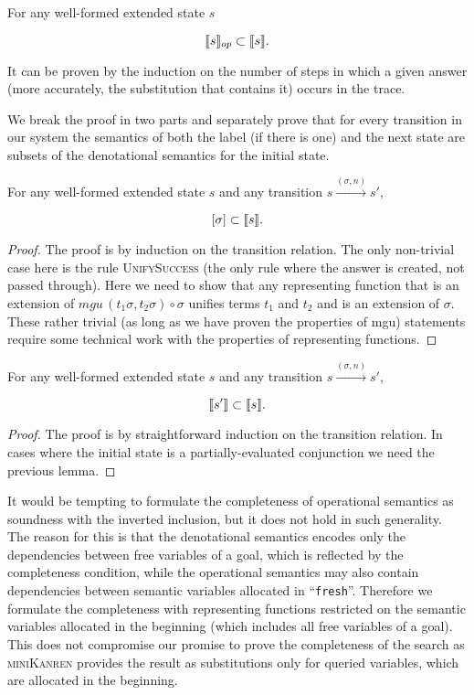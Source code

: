 \begin{lemma}
\label{GenSoundnessLemma}
For any well-formed extended state $s$

\[
\llbracket{s}\rrbracket_{op} \subset \llbracket{s}\rrbracket.
\]
\end{lemma}

It can be proven by the induction on the number of steps in which a given answer (more accurately, the substitution that contains it) occurs in the trace.
{\color{blue} 
We break the proof in two parts and separately prove that for every transition in our system the semantics of both the label (if there is one)
and the next state are subsets of the denotational semantics for the initial state.

\begin{lemma}
\label{AnswerSoundnessLemma}
For any well-formed extended state $s$ and any transition $s \xrightarrow{(\sigma, n)} s'$,

\[
[\sigma] \subset \llbracket{s}\rrbracket.
\]
\end{lemma}
\begin{proof}
  The proof is by induction on the transition relation. The only non-trivial case here is the rule \textsc{UnifySuccess} (the only rule where the answer is created, not passed through).
  Here we need to show that any representing function that is an extension of $mgu\,(t_1 \sigma, t_2 \sigma) \circ \sigma$ unifies terms $t_1$ and $t_2$ and is an extension of $\sigma$.
  These rather trivial (as long as we have proven the properties of mgu) statements require some technical work with the properties of representing functions.
\end{proof}

\begin{lemma}
\label{NextStateSoundnessLemma}
For any well-formed extended state $s$ and any transition $s \xrightarrow{(\sigma, n)} s'$,

\[
\llbracket{s'}\rrbracket \subset \llbracket{s}\rrbracket.
\]
\end{lemma}
\begin{proof}
The proof is by straightforward induction on the transition relation. In cases where the initial state is a partially-evaluated conjunction we need the previous lemma.
\end{proof}
}

It would be tempting to formulate the completeness of operational semantics as soundness with the inverted inclusion, but it does not hold in such generality.
The reason for this is that the denotational semantics encodes only the dependencies between free variables of a goal, which is reflected by the completeness condition,
while the operational semantics may also contain dependencies between semantic variables allocated in ``\lstinline|fresh|''. Therefore we formulate the completeness
with representing functions restricted on the semantic variables allocated in the beginning (which includes all free variables of a goal). This does not
compromise our promise to prove the completeness of the search as \textsc{miniKanren} provides the result as substitutions only for queried variables,
which are allocated in the beginning.

